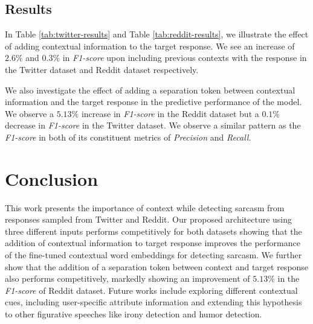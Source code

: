 \documentclass[11pt,a4paper]{article}
\begin{document}
\subsection{Results}

In Table \ref{tab:twitter-results} and Table \ref{tab:reddit-results}, we illustrate the effect of adding contextual information to the target response. We see an increase of $2.6\%$ and $0.3\%$ in \textit{F1-score} upon including previous contexts with the response in the Twitter dataset and Reddit dataset respectively. 

We also investigate the effect of adding a separation token between contextual information and the target response in the predictive performance of the model. We observe a $5.13\%$ increase in \textit{F1-score} in the Reddit dataset but a $0.1\%$ decrease in \textit{F1-score} in the Twitter dataset. We observe a similar pattern as the \textit{F1-score} in both of its constituent metrics of \textit{Precision} and \textit{Recall}.

\section{Conclusion}
This work presents the importance of context while detecting sarcasm from responses sampled from Twitter and Reddit. Our proposed architecture using three different inputs performs competitively for both datasets showing that the addition of contextual information to target response improves the performance of the fine-tuned contextual word embeddings for detecting sarcasm. We further show that the addition of a separation token between context and target response also performs competitively, markedly showing an improvement of $5.13\%$ in the \textit{F1-score} of Reddit dataset. Future works include exploring different contextual cues, including user-specific attribute information and extending this hypothesis to other figurative speeches like irony detection and humor detection.




\appendix
\end{document}
